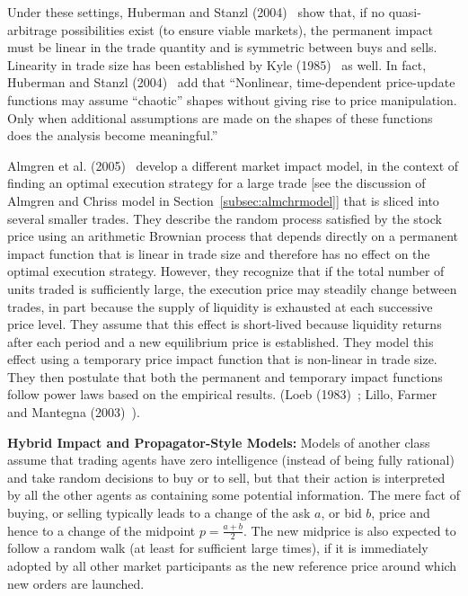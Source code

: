 Under these settings, Huberman and Stanzl (2004)~\cite{huberstan} show that, if no quasi-arbitrage possibilities exist (to ensure viable markets), the permanent impact must be linear in the trade quantity and is symmetric between buys and sells. Linearity in trade size has been established by Kyle (1985)~\cite{kyle1985} as well. In fact, Huberman and Stanzl (2004)~\cite{huberstan} add that ``Nonlinear, time-dependent price-update functions may assume ``chaotic'' shapes without giving rise to price manipulation. Only when additional assumptions are made on the shapes of these functions does the analysis become meaningful.''


Almgren et al. (2005)~\cite{athl} develop a different market impact model, in the context of finding an optimal execution strategy for a large trade [see the discussion of Almgren and Chriss model in Section~\ref{subsec:almchrmodel}] that is sliced into several smaller trades. They describe the random process satisfied by the stock price using an arithmetic Brownian process that depends directly on a permanent impact function that is linear in trade size and therefore has no effect on the optimal execution strategy. However, they recognize that if the total number of units traded is sufficiently large, the execution price may steadily change between trades, in part because the supply of liquidity is exhausted at each successive price level. They assume that this effect is short-lived because liquidity returns after each period and a new equilibrium price is established. They model this effect using a temporary price impact function that is non-linear in trade size. They then postulate that both the permanent and temporary impact functions follow power laws based on the empirical results. (Loeb (1983)~\cite{loeb}; Lillo, Farmer and Mantegna (2003)~\cite{farmermantegna}). \twomedskip


\noindent \textbf{Hybrid Impact and Propagator-Style Models:} Models of another class assume that trading agents have zero intelligence (instead of being fully rational) and take random decisions to buy or to sell, but that their action is interpreted by all the other agents as containing some potential information. The mere fact of buying, or selling typically leads to a change of the ask $a$, or bid $b$, price and hence to a change of the midpoint $p= \frac{a+b}{2}$. The new midprice is also expected to follow a random walk (at least for sufficient large times), if it is immediately adopted by all other market participants as the new reference price around which new orders are launched.


